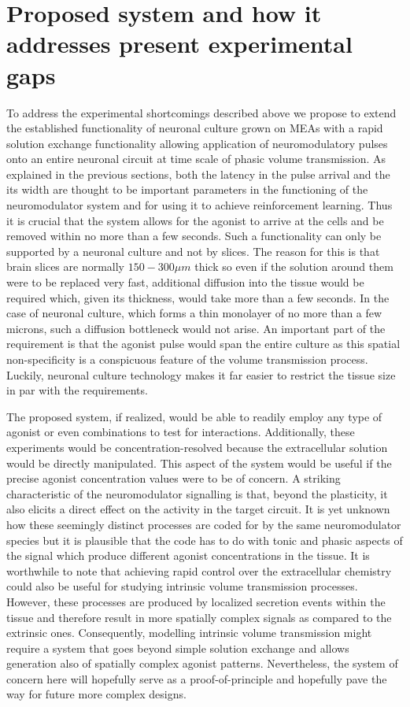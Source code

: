    \section{Proposed system and how it addresses present experimental gaps}
    To address the experimental shortcomings described above we propose to extend the established functionality of neuronal culture grown on MEAs with a rapid solution exchange functionality allowing application of neuromodulatory pulses onto an entire neuronal circuit at time scale of phasic volume transmission. As explained in the previous sections, both the latency in the pulse arrival and the its width are thought to be important parameters in the functioning of the neuromodulator system and for using it to achieve reinforcement learning. Thus it is crucial that the system allows for the agonist to arrive at the cells and be removed within no more than a few seconds. Such a functionality can only be supported by a neuronal culture and not by slices. The reason for this is that brain slices are normally \(150-300 \mu m\) thick so even if the solution around them were to be replaced very fast, additional diffusion into the tissue would be required which, given its thickness, would take more than a few seconds. In the case of neuronal culture, which forms a thin monolayer of no more than a few microns, such a diffusion bottleneck would not arise. An important part of the requirement is that the agonist pulse would span the entire culture as this spatial non-specificity is a conspicuous feature of the volume transmission process. Luckily, neuronal culture technology makes it far easier to restrict the tissue size in par with the requirements.

    The proposed system, if realized, would be able to readily employ any type of agonist or even combinations to test for interactions. Additionally, these experiments would be concentration-resolved because the extracellular solution would be directly manipulated. This aspect of the system would be useful if the precise agonist concentration values were to be of concern. A striking characteristic of the neuromodulator signalling is that, beyond the plasticity, it also elicits a direct effect on the activity in the target circuit. It is yet unknown how these seemingly distinct processes are coded for by the same neuromodulator species but it is plausible that the code has to do with tonic and phasic aspects of the signal which produce different agonist concentrations in the tissue. It is worthwhile to note that achieving rapid control over the extracellular chemistry could also be useful for studying intrinsic volume transmission processes. However, these processes are produced by localized secretion events within the tissue and therefore result in more spatially complex signals as compared to the extrinsic ones. Consequently, modelling intrinsic volume transmission might require a system that goes beyond simple solution exchange and allows generation also of spatially complex agonist patterns. Nevertheless, the system of concern here will hopefully serve as a proof-of-principle and hopefully pave the way for future more complex designs.

